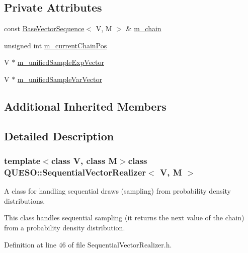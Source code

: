 \subsection*{Private Attributes}
\begin{DoxyCompactItemize}
\item 
const \hyperlink{class_q_u_e_s_o_1_1_base_vector_sequence}{Base\-Vector\-Sequence}$<$ V, M $>$ \& \hyperlink{class_q_u_e_s_o_1_1_sequential_vector_realizer_a4072619c7ef9d9f196bb0d70ec9e8479}{m\-\_\-chain}
\item 
unsigned int \hyperlink{class_q_u_e_s_o_1_1_sequential_vector_realizer_aee9ff35b276862ab8aefd7f2dbe6d232}{m\-\_\-current\-Chain\-Pos}
\item 
V $\ast$ \hyperlink{class_q_u_e_s_o_1_1_sequential_vector_realizer_a9419977e751efa173663218427d5f4ce}{m\-\_\-unified\-Sample\-Exp\-Vector}
\item 
V $\ast$ \hyperlink{class_q_u_e_s_o_1_1_sequential_vector_realizer_a8c4b1311f473131c0ab55f02096b252b}{m\-\_\-unified\-Sample\-Var\-Vector}
\end{DoxyCompactItemize}
\subsection*{Additional Inherited Members}


\subsection{Detailed Description}
\subsubsection*{template$<$class V, class M$>$class Q\-U\-E\-S\-O\-::\-Sequential\-Vector\-Realizer$<$ V, M $>$}

A class for handling sequential draws (sampling) from probability density distributions. 

This class handles sequential sampling (it returns the next value of the chain) from a probability density distribution. 

Definition at line 46 of file Sequential\-Vector\-Realizer.\-h.



